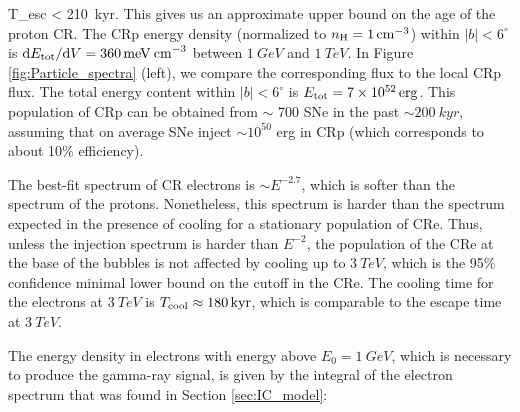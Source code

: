 \be
T_{\rm esc} <  \approx \SI{210}{kyr}.
\ee
This gives us an approximate upper bound on the age of the proton CR.
The CRp energy density (normalized to $n_{\text{H}} = \SI{1}{cm^{-3}}$) within $|b| < 6^\circ$ is 
$\text{d} E_{\text{tot}} / \text{d} V = \SI{360}{meV\: cm^{-3}}$ between $\SI{1}{GeV}$ and $\SI{1}{TeV}$.
In Figure \ref{fig:Particle_spectra} (left), we compare the corresponding flux to the local CRp flux.
The total energy content within $|b| < 6^\circ$ is $E_{\text{tot}} = \SI{7e52}{erg}$.
This population of CRp can be obtained from $\sim$ 700 SNe in the past $\sim \SI{200}{kyr}$, 
assuming that on average SNe inject $\sim 10^{50}$ erg in CRp (which corresponds to about 10\% efficiency).

The best-fit spectrum of CR electrons is $\sim E^{-2.7}$, which is softer than the spectrum of the protons.
Nonetheless, this spectrum is harder than the spectrum expected in the presence of cooling
for a stationary population of CRe.
Thus, unless the injection spectrum is harder than $E^{-2}$, the population of the CRe at the base of the 
bubbles is not affected by cooling up to $\SI{3}{TeV}$,
which is the 95\% confidence minimal lower bound on the cutoff in the CRe. 
The cooling time for the electrons at %
$\SI{3}{TeV}$ is $T_{\rm cool} \approx \SI{180}{kyr}$,
which is comparable to the escape time at $\SI{3}{TeV}$.

The energy density in electrons with energy above $E_0 = \SI{1}{GeV}$, which is necessary to produce the gamma-ray signal, 
is given by the integral of the electron spectrum that was found in Section \ref{sec:IC_model}:

